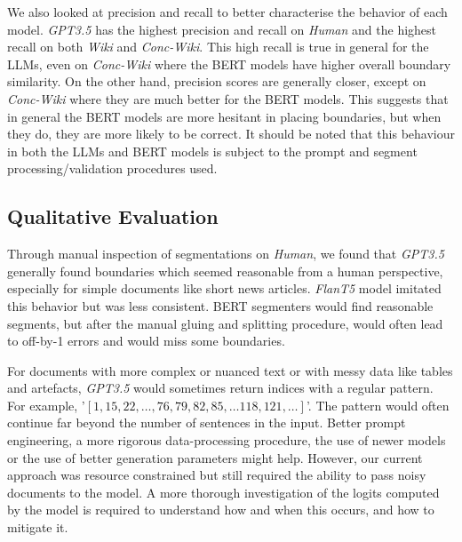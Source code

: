 We also looked at precision and recall to better characterise the behavior of each model. \emph{GPT3.5} has the highest precision and recall on \emph{Human} and the highest recall on both \emph{Wiki} and \emph{Conc-Wiki}. This high recall is true in general for the LLMs, even on \emph{Conc-Wiki} where the BERT models have higher overall boundary similarity. On the other hand, precision scores are generally closer, except on \emph{Conc-Wiki} where they are much better for the BERT models. This suggests that in general the BERT models are more hesitant in placing boundaries, but when they do, they are more likely to be correct. It should be noted that this behaviour in both the LLMs and BERT models is subject to the prompt and segment processing/validation procedures used.

\subsection{Qualitative Evaluation}

Through manual inspection of segmentations on \emph{Human}, we found that \emph{GPT3.5} generally found boundaries which seemed reasonable from a human perspective, especially for simple documents like short news articles. \emph{FlanT5} model imitated this behavior but was less consistent. BERT segmenters would find reasonable segments, but after the manual gluing and splitting procedure, would often lead to off-by-1 errors and would miss some boundaries.

For documents with more complex or nuanced text or with messy data like tables and artefacts, \emph{GPT3.5} would sometimes return indices with a regular pattern. For example, '$[1,15,22, \ldots, 76, 79, 82, 85, \ldots 118, 121, \ldots]$'. The pattern would often continue far beyond the number of sentences in the input. Better prompt engineering, a more rigorous data-processing procedure, the use of newer models or the use of better generation parameters might help. However, our current approach was resource constrained but still required the ability to pass noisy documents to the model. A more thorough investigation of the logits computed by the model is required to understand how and when this occurs, and how to mitigate it.